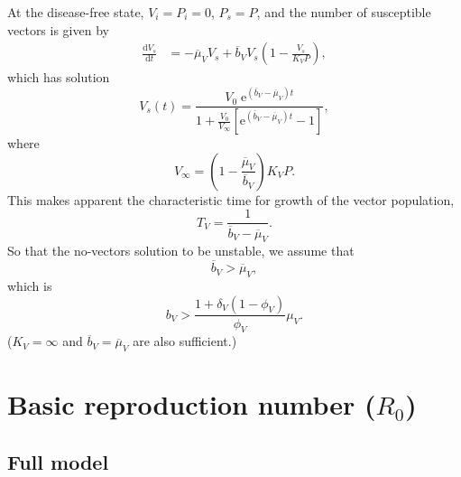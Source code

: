 \documentclass{article}
\newcommand{\md}{\mathrm{d}}
\newcommand{\me}{\mathrm{e}}
\begin{document}
At the disease-free state, $V_i = P_i = 0$, $P_s = P$, and the number
of susceptible vectors is given by
\begin{equation}
  \begin{split}
    \frac{\md V_s}{\md t}
    &=
    - \overline{\mu}_V V_s
    + \overline{b}_V V_s \left(1 - \frac{V_s}{K_V P}\right),
  \end{split}
\end{equation}
which has solution
\begin{equation}
  V_s(t) =
  \frac{V_0 \; \me^{\left(\overline{b}_V - \overline{\mu}_V\right) t}}
  {1 + \frac{V_0}{V_{\infty}}
    \left[\me^{\left(\overline{b}_V - \overline{\mu}_V\right) t} - 1\right]},
\end{equation}
where
\begin{equation}
  V_{\infty} = \left(1 - \frac{\overline{\mu}_V}{\overline{b}_V}\right) K_V P.
\end{equation}
This makes apparent the characteristic time for growth of the vector
population,
\begin{equation}
  T_V = \frac{1}{\overline{b}_V - \overline{\mu}_V}.
\end{equation}
So that the no-vectors solution to be unstable, we assume that
\begin{equation}
  \overline{b}_V > \overline{\mu}_V,
\end{equation}
which is
\begin{equation}
  b_V > \frac{1 + \delta_V (1 - \phi_V)}{\phi_V} \mu_V.
\end{equation}
($K_V = \infty$ and $\overline{b}_V = \overline{\mu}_V$ are also
sufficient.)

\section{Basic reproduction number ($R_0$)}

\subsection{Full model}
\end{document}
